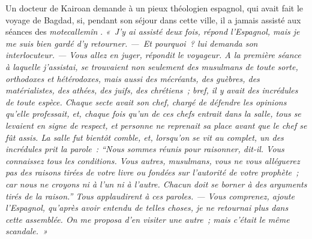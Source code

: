 \documentclass[french,twoside]{book} %
\newcommand\placeName[1]{#1}
\begin{document}
Un docteur de {\placeName Kairoan} demande à un pieux théologien espagnol, qui avait fait le voyage de {\placeName Bagdad}, si, pendant son séjour dans cette ville, il a jamais assisté aux séances des {\itshape motecallemîn} . \emph{« J’y ai assisté deux fois, répond l’Espagnol, mais je me suis bien gardé d’y retourner. — Et pourquoi ? lui demanda son interlocuteur. — Vous allez en juger, répondit le voyageur. A la première séance à laquelle j’assistai, se trouvaient non seulement des musulmans de toute sorte, orthodoxes et hétérodoxes, mais aussi des mécréants, des guèbres, des matérialistes, des athées, des juifs, des chrétiens ; bref, il y avait des incrédules de toute espèce. Chaque secte avait son chef, chargé de défendre les opinions qu’elle professait, et, chaque fois qu’un de ces chefs entrait dans la salle, tous se levaient en signe de respect, et personne ne reprenait sa place avant que le chef se fût assis. La salle fut bientôt comble, et, lorsqu’on se vit au complet, un des incrédules prit la parole : “Nous sommes réunis pour raisonner, dit-il. Vous connaissez tous les conditions. Vous autres, musulmans, vous ne vous alléguerez pas des raisons tirées de votre livre ou fondées sur l’autorité de votre prophète ; car nous ne croyons ni à l’un ni à l’autre. Chacun doit se borner à des arguments tirés de la raison.” Tous applaudirent à ces paroles. — Vous comprenez, ajoute l’Espagnol, qu’après avoir entendu de telles choses, je ne retournai plus dans cette assemblée. On me proposa d’en visiter une autre ; mais c’était le même scandale. »}\par
\end{document}
